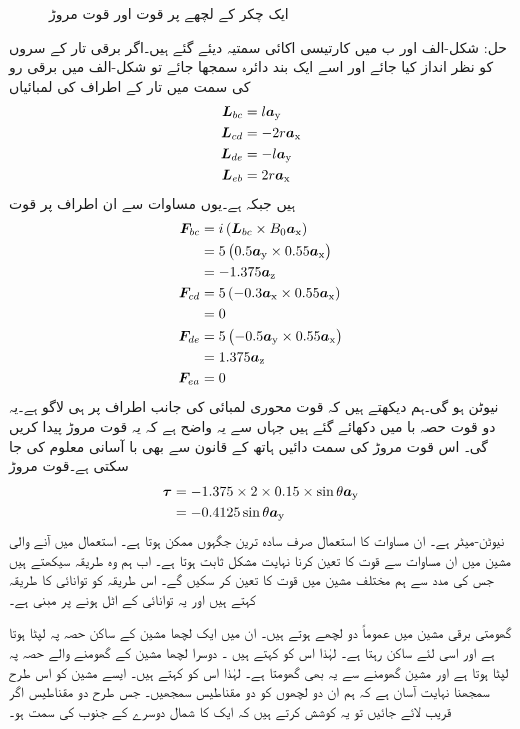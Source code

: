 \begin{figure}
\caption{ایک چکر کے لچھے پر قوت اور قوت مروڑ}
\label{شکل_تبادلہ_طاقت_لچھے_پر_قوت_اور_مروڑ}
\end{figure}
%
حل:
	شکل-الف اور ب میں کارتیسی اکائی سمتیہ دیئے گئے ہیں۔اگر برقی تار کے سروں کو نظر انداز کیا جائے اور اسے ایک بند دائرہ سمجھا جائے تو  شکل-الف میں  برقی رو کی سمت میں تار کے اطراف کی لمبائیاں 
\begin{align*}
{\ensuremath{{\boldsymbol{L}}}}_{bc}&=l {\boldsymbol{a}}_{\textup{y}}\\
{{\boldsymbol{L}}}_{cd}&=-2 r {\boldsymbol{a}}_{\textup{x}}\\
{{\boldsymbol{L}}}_{de}&=-l {\boldsymbol{a}}_{\textup{y}}\\
{{\boldsymbol{L}}}_{eb}&=2 r {\boldsymbol{a}}_{\textup{x}}
\end{align*}
ہیں جبکہ  ہے۔یوں مساوات   سے ان اطراف پر قوت
\begin{align*}
{\ensuremath{{\boldsymbol{F}}}}_{bc}&= i \left({{\boldsymbol{L}}}_{bc} \times B_0 {\boldsymbol{a}}_{\textup{x}} \right)\\
&=5 \left(0.5 {\boldsymbol{a}}_{\textup{y}} \times 0.55 {\boldsymbol{a}}_{\textup{x}} \right)\\
&=-1.375 {\boldsymbol{a}}_{\textup{z}}\\
{{\boldsymbol{F}}}_{cd}&= 5\left(-0.3{\boldsymbol{a}}_{\textup{x}} \times 0.55 {\boldsymbol{a}}_{\textup{x}} \right)\\
&=0\\
{{\boldsymbol{F}}}_{de}&= 5 \left(-0.5{\boldsymbol{a}}_{\textup{y}} \times 0.55 {\boldsymbol{a}}_{\textup{x}} \right)\\
&=1.375 {\boldsymbol{a}}_{\textup{z}}\\
{{\boldsymbol{F}}}_{ea}&= 0
\end{align*}
نیوٹن ہو گی۔ہم دیکھتے ہیں کہ قوت محوری لمبائی کی جانب اطراف پر ہی لاگو  ہے۔یہ دو قوت حصہ با میں دکھائے گئے ہیں جہاں سے یہ واضح ہے کہ یہ قوت مروڑ پیدا کریں گی۔ اس قوت مروڑ کی سمت دائیں ہاتھ کے قانون سے بھی با آسانی معلوم کی جا سکتی ہے۔قوت مروڑ
\begin{align*}
{\ensuremath{{\boldsymbol{\tau}}}}&=-1.375 \times 2 \times 0.15 \times \sin \theta {\boldsymbol{a}}_{\textup{y}}\\
&=-0.4125 \sin \theta {\boldsymbol{a}}_{\textup{y}}
\end{align*}
نیوٹن-میٹر ہے۔
%
	 ان مساوات کا استعمال صرف سادہ ترین جگہوں ممکن ہوتا ہے۔ استعمال میں آنے والی مشین میں ان مساوات سے قوت کا تعین کرنا نہایت مشکل ثابت ہوتا ہے۔ اب ہم وہ طریقہ سیکھتے ہیں جس کی مدد سے ہم مختلف مشین میں قوت کا تعین کر سکیں گے۔ اس طریقہ کو توانائی کا طریقہ کہتے ہیں اور یہ توانائی کے اٹل ہونے پر مبنی ہے۔

گھومتی برقی مشین میں عموماً دو لچھے ہوتے ہیں۔ ان میں ایک لچھا  مشین کے ساکن حصہ پہ لپٹا ہوتا ہے اور اسی لئے ساکن رہتا ہے۔ لہٰذا  اس کو    کہتے ہیں ۔  دوسرا لچھا  مشین کے گھومنے والے حصہ پہ لپٹا ہوتا ہے اور مشین گھومنے سے یہ بھی گھومتا ہے۔ لہٰذا اس کو   کہتے ہیں۔  ایسے مشین  کو اس طرح سمجھنا نہایت آسان ہے کہ ہم ان دو لچھوں کو دو مقناطیس سمجھیں۔ جس طرح دو مقناطیس اگر قریب لائے جائیں تو یہ کوشش کرتے ہیں کہ ایک کا شمال  دوسرے کے جنوب  کی سمت  ہو۔

